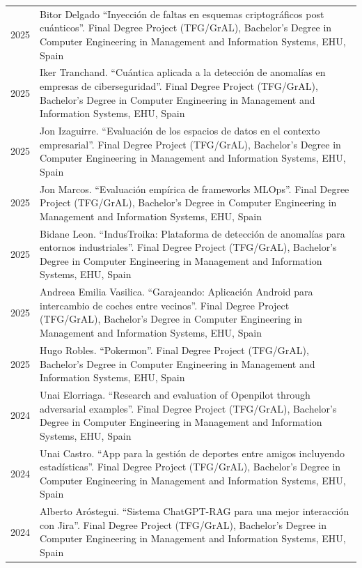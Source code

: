 \documentclass[11pt,fullpage]{article}
\begin{document}
\begin{longtable}{p{0.5in}|p{5.5in}}
2025 & Bitor Delgado ``Inyección de faltas en esquemas criptográficos post cuánticos''. Final Degree Project (TFG/GrAL), Bachelor's Degree in Computer Engineering in Management and Information Systems, EHU, Spain \\
2025 & Iker Tranchand. ``Cuántica aplicada a la detección de anomalías en empresas de ciberseguridad''. Final Degree Project (TFG/GrAL), Bachelor's Degree in Computer Engineering in Management and Information Systems, EHU, Spain \\
2025 & Jon Izaguirre. ``Evaluación de los espacios de datos en el contexto empresarial''. Final Degree Project (TFG/GrAL), Bachelor's Degree in Computer Engineering in Management and Information Systems, EHU, Spain \\
2025 & Jon Marcos. ``Evaluación empírica de frameworks MLOps''. Final Degree Project (TFG/GrAL), Bachelor's Degree in Computer Engineering in Management and Information Systems, EHU, Spain \\
2025 & Bidane Leon. ``IndusTroika: Plataforma de detección de anomalías para entornos industriales''. Final Degree Project (TFG/GrAL), Bachelor's Degree in Computer Engineering in Management and Information Systems, EHU, Spain \\
2025 & Andreea Emilia Vasilica. ``Garajeando: Aplicación Android para intercambio de coches entre vecinos''. Final Degree Project (TFG/GrAL), Bachelor's Degree in Computer Engineering in Management and Information Systems, EHU, Spain \\
2025 & Hugo Robles. ``Pokermon''. Final Degree Project (TFG/GrAL), Bachelor's Degree in Computer Engineering in Management and Information Systems, EHU, Spain \\
2024 & Unai Elorriaga. ``Research and evaluation of Openpilot through adversarial examples''. Final Degree Project (TFG/GrAL), Bachelor's Degree in Computer Engineering in Management and Information Systems, EHU, Spain \\ 
2024 & Unai Castro. ``App para la gestión de deportes entre amigos incluyendo estadísticas''. Final Degree Project (TFG/GrAL), Bachelor's Degree in Computer Engineering in Management and Information Systems, EHU, Spain \\   
2024 & Alberto Aróstegui. ``Sistema ChatGPT-RAG para una mejor interacción con Jira''. Final Degree Project (TFG/GrAL), Bachelor's Degree in Computer Engineering in Management and Information Systems, EHU, Spain \\ 

\end{longtable}
\end{document}
